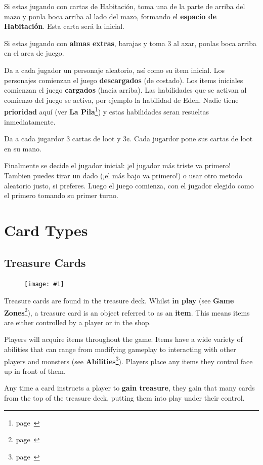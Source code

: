 \documentclass[
  fontsize=10pt,
  paper=a5,
  version=last,
  chapterprefix=true,
  bindingoffset=5mm,
  ]{scrbook}
\newcommand{\cardw}{0.3\textwidth}
\newcommand{\cardfigv}[1]{
    \begin{figure}
        \texttt{[image: \#1]}
    \end{figure}
}
\begin{document}
    Si estas jugando con cartas de Habitación, toma una de la parte de arriba del mazo y ponla boca arriba al lado del mazo, formando el \textbf{espacio de Habitación}. Esta carta será la inicial.

    Si estas jugando con \textbf{almas extras}, barajas y toma 3 al azar, ponlas boca arriba en el area de juego.

    Da a cada jugador un personaje aleatorio, así como su item inicial. Los personajes comienzan el juego \textbf{descargados} (de costado). Los items iniciales comienzan el juego \textbf{cargados} (hacia arriba). Las habilidades que se activan al comienzo del juego se activa, por ejemplo la habilidad de Eden. Nadie tiene \textbf{prioridad} aquí (ver \textbf{La Pila}\footnote{page~\pageref{stack}}) y estas habilidades seran resueltas inmediatamente.

     Da a cada jugardor 3 cartas de loot y 3¢. Cada jugardor pone sus cartas de loot en su mano.

    Finalmente se decide el jugador inicial: ¡el jugador más triste va primero! Tambien puedes tirar un dado (¡el más bajo va primero!) o usar otro metodo aleatorio justo, si preferes. Luego el juego comienza, con el jugador elegido como el primero tomando su primer turno.

    
    \chapter{Card Types}
    \label{types}
    \section{Treasure Cards}
    \cardfigv{assets/treasure.png}
    Treasure cards are found in the treasure deck. Whilst \textbf{in play} (see \textbf{Game Zones}\footnote{page~\pageref{zones}}), a treasure card is an object referred to as an \textbf{item}. This means items are either controlled by a player or in the shop.
  
    Players will acquire items throughout the game. Items have a wide variety of abilities that can range from modifying gameplay to interacting with other players and monsters (see \textbf{Abilities}\footnote{page~\pageref{abilities}}). Players place any items they control face up in front of them.
  
    Any time a card instructs a player to \textbf{gain treasure}, they gain that many cards from the top of the treasure deck, putting them into play under their control.
  
\end{document}

